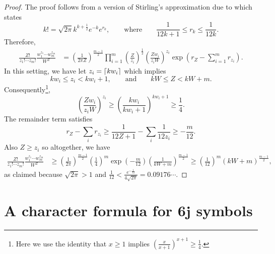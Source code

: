 \documentclass[notitlepage, 10pt]{article}
\begin{document}
\begin{proof}
    The proof follows from a version of Stirling's approximation due to \citeauthor{robbins1955remark} \cite{robbins1955remark} which states
    \begin{equation}
        k! = \sqrt{2\pi} k^{k+\frac{1}{2}} e^{-k} e^{r_k}, 
        \qquad
        \text{where}
        \qquad
        \frac{1}{12k+1}\leq r_k \leq \frac{1}{12k}.
    \end{equation}
    Therefore,
    \begin{align}
        \frac{Z!}{z_1! \cdots z_m!}\frac{w_1^{z_{1}}\cdots w_{m}^{z_{m}}}{W^{Z}}
        &=\left(\frac{1}{2\pi Z}\right)^{\frac{m-1}{2}}\prod_{i=1}^{m}\left(\frac{Z}{z_i}\right)^{\frac{1}{2}}\left(\frac{Zw_i}{z_iW}\right)^{z_i}\exp\left(r_{Z} - \sum_{i=1}^{m} r_{z_i}\right).
    \end{align}
    In this setting, we have let $z_i = \left\lceil k w_i\right\rceil$ which implies
    \begin{equation}
        kw_i \leq z_i < kw_i + 1,
        \qquad \text{and} \qquad
        kW \leq Z < kW+m.
    \end{equation}
    Consequently\footnote{Here we use the identity that $x \geq 1$ implies $\left(\frac{x}{x+1}\right)^{x+1} \geq \frac{1}{4}$.},
    \begin{equation}
        \left(\frac{Zw_i}{z_iW}\right)^{z_i}
        \geq \left(\frac{kw_i}{kw_i+1}\right)^{kw_i+1} \geq \frac{1}{4}.
    \end{equation}
    The remainder term satisfies
    \begin{equation}
        r_{Z} - \sum_{i} r_{z_i} \geq \frac{1}{12Z + 1} - \sum_{i}\frac{1}{12z_i} \geq - \frac{m}{12}.
    \end{equation}
    Also $Z \geq z_i$ so altogether, we have
    \begin{align}
        \frac{Z!}{z_1! \cdots z_m!}\frac{w_1^{z_{1}}\cdots w_{m}^{z_{m}}}{W^{Z}}
        &\geq \left(\frac{1}{2\pi}\right)^{\frac{m-1}{2}}\left(\frac{1}{4}\right)^{m}\exp\left(-\frac{m}{12}\right) \left(\frac{1}{kW+m}\right)^{\frac{m-1}{2}} \geq \left(\frac{1}{12}\right)^{m}(kW + m)^{\frac{m-1}{2}},
    \end{align}
    as claimed because $\sqrt{2\pi} > 1$ and $\frac{1}{12} < \frac{e^{-\frac{1}{12}}}{4\sqrt{2\pi}} = 0.09176\cdots$.
\end{proof}

\section{A character formula for \texorpdfstring{$\boldsymbol{6j}$}{6j} symbols}
\end{document}
